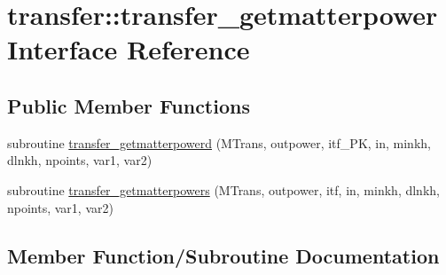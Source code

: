 \hypertarget{interfacetransfer_1_1transfer__getmatterpower}{}\section{transfer\+:\+:transfer\+\_\+getmatterpower Interface Reference}
\label{interfacetransfer_1_1transfer__getmatterpower}
\subsection*{Public Member Functions}
\begin{DoxyCompactItemize}
\item 
subroutine \mbox{\hyperlink{interfacetransfer_1_1transfer__getmatterpower_a3036bf11b03bbe08ef1ed89d19f406b7}{transfer\+\_\+getmatterpowerd}} (M\+Trans, outpower, itf\+\_\+\+PK, in, minkh, dlnkh, npoints, var1, var2)
\item 
subroutine \mbox{\hyperlink{interfacetransfer_1_1transfer__getmatterpower_a40ca4d612572e58242f5e0ec92864f37}{transfer\+\_\+getmatterpowers}} (M\+Trans, outpower, itf, in, minkh, dlnkh, npoints, var1, var2)
\end{DoxyCompactItemize}


\subsection{Member Function/\+Subroutine Documentation}
\mbox{\label{interfacetransfer_1_1transfer__getmatterpower_a3036bf11b03bbe08ef1ed89d19f406b7}} 
